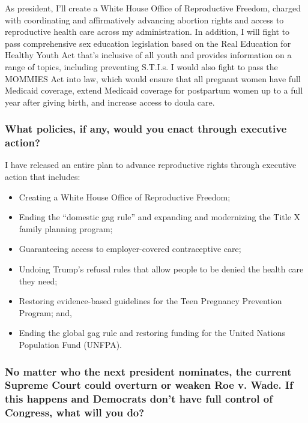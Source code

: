 As president, I'll create a White House Office of Reproductive Freedom,
charged with coordinating and affirmatively advancing abortion rights
and access to reproductive health care across my administration. In
addition, I will fight to pass comprehensive sex education legislation
based on the Real Education for Healthy Youth Act that's inclusive of
all youth and provides information on a range of topics, including
preventing S.T.I.s. I would also fight to pass the MOMMIES Act into law,
which would ensure that all pregnant women have full Medicaid coverage,
extend Medicaid coverage for postpartum women up to a full year after
giving birth, and increase access to doula care.

\hypertarget{what-policies-if-any-would-you-enact-through-executive-action-1}{%
\subsubsection{What policies, if any, would you enact through executive
action?}\label{what-policies-if-any-would-you-enact-through-executive-action-1}}

I have released an entire plan to advance reproductive rights through
executive action that includes:

\begin{itemize}
\item
  Creating a White House Office of Reproductive Freedom;
\item
  Ending the ``domestic gag rule'' and expanding and modernizing the
  Title X family planning program;
\item
  Guaranteeing access to employer-covered contraceptive care;
\item
  Undoing Trump's refusal rules that allow people to be denied the
  health care they need;
\item
  Restoring evidence-based guidelines for the Teen Pregnancy Prevention
  Program; and,
\item
  Ending the global gag rule and restoring funding for the United
  Nations Population Fund (UNFPA).
\end{itemize}

\hypertarget{no-matter-who-the-next-president-nominates-the-current-supreme-court-could-overturn-or-weaken-roe-v-wade-if-this-happens-and-democrats-dont-have-full-control-of-congress-what-will-you-do-1}{%
\subsubsection{No matter who the next president nominates, the current
Supreme Court could overturn or weaken Roe v. Wade. If this happens and
Democrats don't have full control of Congress, what will you
do?}\label{no-matter-who-the-next-president-nominates-the-current-supreme-court-could-overturn-or-weaken-roe-v-wade-if-this-happens-and-democrats-dont-have-full-control-of-congress-what-will-you-do-1}}

